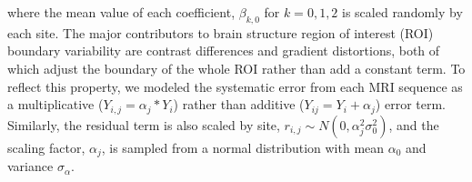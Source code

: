 where the mean value of each coefficient,
$\beta_{k,0}$ for  $k=0,1,2$ is scaled randomly by each site. The major contributors to brain structure region of interest (ROI) boundary variability are contrast differences and gradient distortions, both of which adjust the boundary of the whole ROI rather than add a constant term. To reflect this property, we modeled the systematic error from each MRI sequence as a multiplicative ($Y_{i,j} = \alpha_j*Y_i$) rather than additive ($Y_{ij} = Y_i + \alpha_j$) error term. Similarly, the residual term is also scaled by site, $r_{i,j} \sim N(0,\alpha_j^2\sigma_0^2)$, and the scaling factor, $\alpha_j$, is sampled from a normal distribution with mean $\alpha_0$ and variance $\sigma_{\alpha}$.